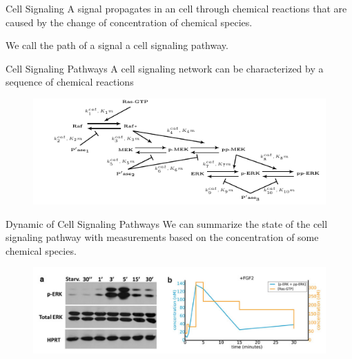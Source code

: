 \documentclass{beamer}
\begin{document}
\begin{frame}{Cell Signaling}
A signal propagates in an cell through chemical reactions that are
caused by the change of concentration of chemical species.

\pause
We call the path of a signal a cell signaling pathway.
\end{frame}


\begin{frame}{Cell Signaling Pathways}
A cell signaling network can be characterized by a sequence of chemical 
reactions 
\begin{figure}
    \includegraphics[scale=1.2, trim={.5cm 0 0 0}, clip]{introduction/csp_example.pdf}
\end{figure}
\end{frame}

\begin{frame}{Dynamic of Cell Signaling Pathways}
We can summarize the state of the cell signaling pathway with 
measurements based on the concentration of some chemical species.

\begin{figure}
    \includegraphics[scale=.3]{introduction/dynamic_example.png}
\end{figure}
\end{frame}



\end{document}
